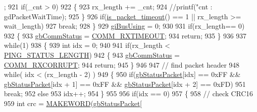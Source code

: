 \begin{DoxyCode}
      ;
921                 \textcolor{keywordflow}{if}(\_cnt > 0)
922                 \{
923                     rx\_length += \_cnt;
924                     \textcolor{comment}{//printf("cnt : %
       gdPacketWaitTime);}
925                 \}
926                 \textcolor{keywordflow}{if}(\hyperlink{classdynamixel2_a4c996c0d9edcfd320906674512837a9e}{is\_packet\_timeout}() == 1 || rx\_length >= wait\_length)
927                     \textcolor{keywordflow}{break};
928             \}
929             \hyperlink{classdynamixel2_a7fc43b4c4b7e36aa8f0420b037658f83}{giBusUsing} = 0;
930 
931             \textcolor{keywordflow}{if}(rx\_length== 0)
932             \{
933                 \hyperlink{classdynamixel2_a703e327ba8ec5909c238dc94a00cb32d}{gbCommStatus} = \hyperlink{dynamixel_8h_af9976398353d104bb8a78b1f02f9fceb}{COMM\_RXTIMEOUT};
934                 \textcolor{keywordflow}{return};
935             \}
936 
937             \textcolor{keywordflow}{while}(1)
938             \{
939                 \textcolor{keywordtype}{int} idx = 0;
940 
941                 \textcolor{keywordflow}{if}(rx\_length < \hyperlink{dynamixel_8cpp_aedac6609b233fa877f86b3804204a2fe}{PING\_STATUS\_LENGTH})
942                 \{
943                     \hyperlink{classdynamixel2_a703e327ba8ec5909c238dc94a00cb32d}{gbCommStatus} = \hyperlink{dynamixel_8h_a93c30bd345d8077112f0a3524d26278b}{COMM\_RXCORRUPT};
944                     \textcolor{keywordflow}{return};
945                 \}
946 
947                 \textcolor{comment}{// find packet header}
948                 \textcolor{keywordflow}{while}( idx < (rx\_length - 2) )
949                 \{
950                     \textcolor{keywordflow}{if}(\hyperlink{classdynamixel2_a0776f210a190cf57d1a6faf9697a593d}{gbStatusPacket}[idx] == 0xFF && 
      \hyperlink{classdynamixel2_a0776f210a190cf57d1a6faf9697a593d}{gbStatusPacket}[idx + 1] == 0xFF && \hyperlink{classdynamixel2_a0776f210a190cf57d1a6faf9697a593d}{gbStatusPacket}[idx + 2] == 0xFD)
951                         \textcolor{keywordflow}{break};
952                     \textcolor{keywordflow}{else}
953                         idx++;
954                 \}
955 
956                 \textcolor{keywordflow}{if}(idx == 0)
957                 \{
958                     \textcolor{comment}{// check CRC16}
959                     \textcolor{keywordtype}{int} crc = \hyperlink{dynamixel_8h_a6b98c16b8e3e7733dd4063d0b0fac24c}{MAKEWORD}(\hyperlink{classdynamixel2_a0776f210a190cf57d1a6faf9697a593d}{gbStatusPacket}[

\end{DoxyCode}
